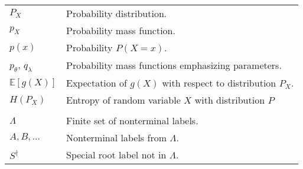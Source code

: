 \begin{table}[h]
\begin{tabular}{l|l}
    $P_X$ & Probability distribution.  \\

    $p_{X}$ & Probability mass function. \\

    $p(x)$ & Probability $P(X = x)$. \\

    $p_{\theta}$, $q_{\lambda}$ & Probability mass functions emphasizing parameters.   \\

    $\mathbb{E}[g(X)]$ & Expectation of $g(X)$ with respect to distribution $P_X$.  \\

    $H(P_X)$ & Entropy of random variable $X$ with distribution $P$ \\
    & \\

    $\Lambda$ & Finite set of nonterminal labels.  \\
    $A, B, \dots$ & Nonterminal labels from $\Lambda$.  \\
    $S^{\dagger}$ & Special root label not in $\Lambda$.  \\



    \hline\hline
  \end{tabular}

\end{table}

% 
